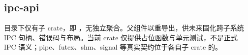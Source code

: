 
\subsection{ipc-api}

目录下仅有子 crate，即 ，无独立聚合。父组件以重导出，供未来固化跨子系统 IPC 句柄、错误码与布局。当前 crate 仅提供占位函数与单元测试，不是正式 IPC 语义；pipe、futex、shm、signal 等真实契约位于各自子 crate 的。


